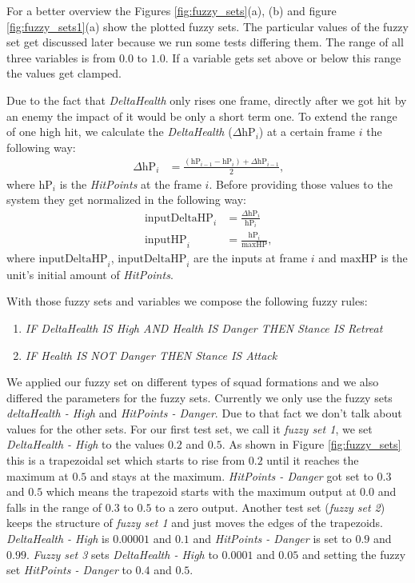 For a better overview the Figures \ref{fig:fuzzy_sets}(a), (b) and figure \ref{fig:fuzzy_sets1}(a) show the plotted fuzzy sets. The particular values of the fuzzy set get discussed later because we run some tests differing them. The range of all three variables is from $0.0$ to $1.0$. If a variable gets set above or below this range the values get clamped.

Due to the fact that {\it DeltaHealth} only rises one frame, directly after we got hit by an enemy the impact of it would be only a short term one. To extend the range of one high hit, we calculate the {\it DeltaHealth} ($\Delta \textrm{hP}_i$) at a certain frame $i$ the following way:
\begin{align}
	\Delta \textrm{hP}_i &= \frac{( \textrm{hP}_{i-1} - \textrm{hP}_i ) + \Delta \textrm{hP}_{i-1}}{2}  \text{,}
\end{align}
where $\textrm{hP}_{i}$ is the {\it HitPoints} at the frame $i$. Before providing those values to the system they get normalized in the following way:
\begin{align}
	\textrm{inputDeltaHP}_i 	&= \frac{\Delta \textrm{hP}_i}{ \textrm{hP}_i} \\
 	\textrm{inputHP}_i 	&= \frac{\textrm{hP}_i}{ \textrm{maxHP}}  \text{,}
\end{align}
where $\textrm{inputDeltaHP}_i$, $\textrm{inputDeltaHP}_i$ are the inputs at frame $i$ and $ \textrm{maxHP}$ is the unit's initial amount of {\it HitPoints}.


With those fuzzy sets and variables we compose the following fuzzy rules:
\begin{enumerate}
	\item {\sl IF DeltaHealth IS High AND Health IS Danger THEN Stance IS Retreat }
	\item {\sl IF Health IS NOT Danger THEN Stance IS Attack }
\end{enumerate}


We applied our fuzzy set on different types of squad formations and we also differed the parameters for the fuzzy sets. Currently we only use the fuzzy sets {\it deltaHealth - High} and {\it HitPoints - Danger}. Due to that fact we don't talk about values for the other sets.
For our first test set, we call it \emph{fuzzy set 1}, we set {\it DeltaHealth - High} to the values $0.2$ and $0.5$. As shown in Figure \ref{fig:fuzzy_sets} this is a trapezoidal set which starts to rise from $0.2$ until it reaches the maximum at $0.5$ and stays at the maximum.
{\it HitPoints - Danger} got set to $0.3$ and $0.5$ which means the trapezoid starts with the maximum output at $0.0$ and falls in the range of $0.3$ to $0.5$ to a zero output.
Another test set (\emph{fuzzy set 2}) keeps the structure of  \emph{fuzzy set 1} and just moves the edges of the trapezoids.  {\it DeltaHealth - High} is  $0.00001$ and $0.1$ and {\it HitPoints - Danger} is set to $0.9$ and $0.99$.
\emph{Fuzzy set 3} sets {\it DeltaHealth - High} to $0.0001$ and $0.05$ and setting the fuzzy set {\it HitPoints - Danger} to $0.4$ and $0.5$.

